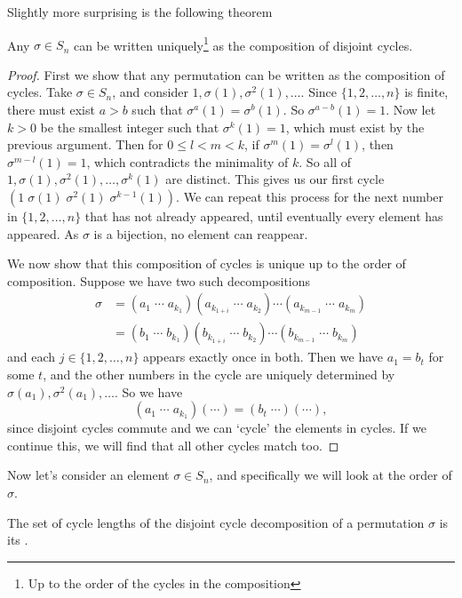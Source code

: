 Slightly more surprising is the following theorem
\begin{theorem}
	Any $\sigma \in S_n$ can be written uniquely\footnote{Up to the order of the cycles in the composition} as the composition of disjoint cycles.
\end{theorem}
\begin{proof}
	First we show that any permutation can be written as the composition of cycles.
	Take $\sigma \in S_n$, and consider $1, \sigma(1), \sigma^2(1), \dots$. Since $\{1, 2, \dots, n\}$ is finite, there must exist $a > b$ such that $\sigma^a(1) = \sigma^b(1)$. So $\sigma^{a -b}(1) = 1$. Now let $k > 0$ be the smallest integer such that $\sigma^k(1) = 1$, which must exist by the previous argument. Then for $0 \leq l < m < k$, if $\sigma^m(1) = \sigma^l(1)$, then $\sigma^{m - l}(1) = 1$, which contradicts the minimality of $k$. So all of $1, \sigma(1), \sigma^2(1), \dots, \sigma^k(1)$ are distinct. This gives us our first cycle $(1\; \sigma(1)\; \sigma^2(1)\; \sigma^{k - 1}(1))$.
	We can repeat this process for the next number in $\{1, 2, \dots, n\}$ that has not already appeared, until eventually every element has appeared. As $\sigma$ is a bijection, no element can reappear.

	We now show that this composition of cycles is unique up to the order of composition. Suppose we have two such decompositions
	\begin{align*}
		\sigma &= (a_1 \; \cdots \; a_{k_1}) (a_{k_{1 + i}} \; \cdots \; a_{k_2}) \cdots (a_{k_{m - 1}} \; \cdots \; a_{k_m})\\
		  &= (b_1 \; \cdots \; b_{k_1}) (b_{k_{1 + i}} \; \cdots \; b_{k_2}) \cdots (b_{k_{m - 1}} \; \cdots \; b_{k_m})
	\end{align*}
	and each $j \in \{1, 2, \dots, n\}$ appears exactly once in both. Then we have $a_1 = b_t$ for some $t$, and the other numbers in the cycle are uniquely determined by $\sigma(a_1), \sigma^2(a_1), \dots$. So we have
	$$
	(a_1\; \cdots\; a_{k_1}) (\cdots) = (b_t\; \cdots)(\cdots),
	$$
	since disjoint cycles commute and we can `cycle' the elements in cycles. If we continue this, we will find that all other cycles match too.
\end{proof}

Now let's consider an element $\sigma \in S_n$, and specifically we will look at the order of $\sigma$.

\begin{definition}
	The set of cycle lengths of the disjoint cycle decomposition of a permutation $\sigma$ is its .
\end{definition}

